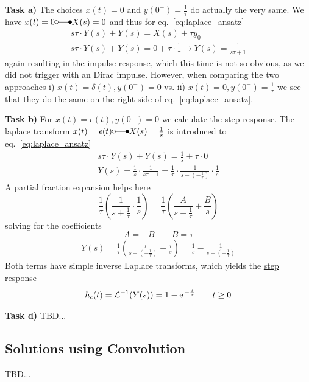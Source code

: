 \documentclass[11pt,a4paper,DIV=12]{scrartcl}
\begin{document}
\textbf{Task a)} The choices $x(t)=0$ and $y(0^-)=\frac{1}{\tau}$
do actually the very same.
We have $x(t)=0 \laplace X(s)=0$ and thus for eq.~\eqref{eq:laplace_ansatz}
\begin{align}
s \tau \cdot Y(s) + Y(s) = X(s) + \tau y_0\\
s \tau \cdot Y(s) + Y(s) = 0 + \tau \cdot \frac{1}{\tau}
\rightarrow Y(s) = \frac{1}{s \tau + 1}
\end{align}
again resulting in the impulse response, which this time is not so obvious, as
we did not trigger with an Dirac impulse.
However, when comparing the
two approaches i) $x(t)=\delta(t), y(0^-)=0$ vs. ii) $x(t)=0, y(0^-)=\frac{1}{\tau}$
we see that they do the same on the right side of eq.~\eqref{eq:laplace_ansatz}.

\textbf{Task b)} For $x(t)=\epsilon(t), y(0^-)=0$ we calculate the step response.
The laplace transform $x(t)=\epsilon(t) \laplace X(s) = \frac{1}{s}$ is introduced to eq.~\eqref{eq:laplace_ansatz}
\begin{align}
s \tau \cdot Y(s) + Y(s) = \frac{1}{s} + \tau \cdot 0\\
Y(s) = \frac{1}{s} \cdot \frac{1}{s \tau + 1} = \frac{1}{\tau} \cdot \frac{1}{s - (-\frac{1}{\tau})} \cdot \frac{1}{s}
\end{align}
A partial fraction expansion helps here
\begin{equation}
\frac{1}{\tau} (\frac{1}{s + \frac{1}{\tau}} \cdot \frac{1}{s} ) =
\frac{1}{\tau} (\frac{A}{s + \frac{1}{\tau}} + \frac{B}{s})
\end{equation}
solving for the coefficients
\begin{equation}
  A=-B\qquad B = \tau
\end{equation}
\begin{align}
Y(s) = \frac{1}{\tau} (\frac{-\tau}{s - (-\frac{1}{\tau})} + \frac{\tau}{s})
= \frac{1}{s} - \frac{1}{s - (-\frac{1}{\tau})}
\end{align}
Both terms have simple inverse Laplace transforms, which yields the \underline{step response}
\begin{align}
h_\epsilon(t) = \mathcal{L}^{-1}(Y(s)) = 1 - \e^{-\frac{t}{\tau}}\qquad t \geq 0
\end{align}

\textbf{Task d)} TBD...



\subsection{Solutions using Convolution}
TBD...












\newpage

\end{document}
